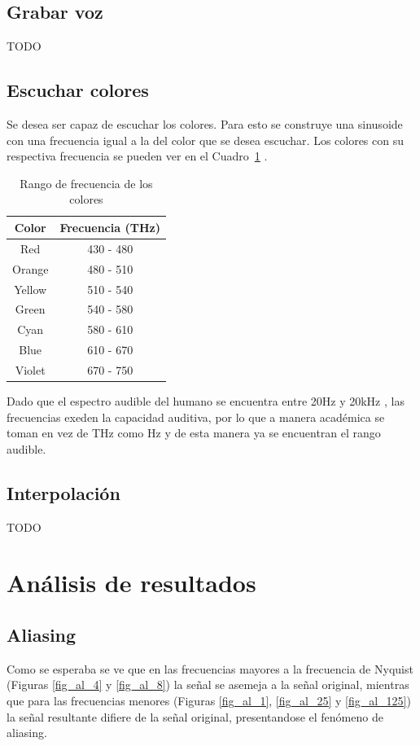\documentclass[comsoc, journal]{IEEEtran}
\begin{document}
\subsection{Grabar voz}
TODO

\subsection{Escuchar colores}
Se desea ser capaz de escuchar los colores. Para esto se construye una sinusoide con una frecuencia igual a la del color que se desea escuchar. Los colores con su respectiva frecuencia se pueden ver en el Cuadro~\ref{table_color} \cite{bohren}.

\begin{table}[!t]
    \renewcommand{\arraystretch}{1.3}
    \caption{Rango de frecuencia de los colores}
    \label{table_color}
    \centering
    \begin{tabular}{|c|c|}
        \hline
        Color & Frecuencia (THz)\\
        \hline
        Red	    & 430 - 480\\
        \hline
        Orange	& 480 - 510\\
        \hline
        Yellow	& 510 - 540\\
        \hline
        Green	& 540 - 580\\
        \hline
        Cyan	& 580 - 610\\
        \hline
        Blue	& 610 - 670\\
        \hline
        Violet	& 670 - 750\\
        \hline
    \end{tabular}
\end{table}

Dado que el espectro audible del humano se encuentra entre 20Hz y 20kHz \cite{rosen}, las frecuencias exeden la capacidad auditiva, por lo que a manera académica se toman en vez de THz como Hz y de esta manera ya se encuentran el rango audible.

\subsection{Interpolación}
TODO

\section{Análisis de resultados}
\subsection{Aliasing}
Como se esperaba se ve que en las frecuencias mayores a la frecuencia de Nyquist (Figuras \ref{fig_al_4} y \ref{fig_al_8}) la señal se asemeja a la señal original, mientras que para las frecuencias menores (Figuras \ref{fig_al_1}, \ref{fig_al_25} y \ref{fig_al_125}) la señal resultante difiere de la señal original, presentandose el fenómeno de aliasing.
\end{document}
